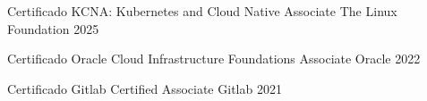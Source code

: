 

\begin{cvhonors}

\cvhonor
  {Certificado} %
  {KCNA: Kubernetes and Cloud Native Associate} %
  {The Linux Foundation} %
  {2025} %


\cvhonor
  {Certificado} %
  {Oracle Cloud Infrastructure Foundations Associate} %
  {Oracle} %
  {2022} %


  \cvhonor
    {Certificado} %
    {Gitlab Certified Associate} %
    {Gitlab} %
    {2021} %

\end{cvhonors}

